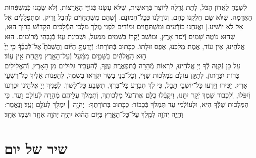 \documentclass[twoside, openany, parskip=half, 11pt]{book}
\begin{document}
\uvaletzion

\\
\\


\label{end of shacharis}
\fullkaddish

\newcommand{\aleinu}{
\firstword{עָלֵֽינוּ}
לְֿשַׁבֵּחַ לַאֲדוֹן הַכֹּל, לָתֵת גְּֿדֻלָּה לְֿיוֹצֵר בְּֿרֵאשִׁית, שֶׁלֹּא עָשָׂנוּ כְּֿגוֹיֵי הָאֲרָצוֹת, וְֿלֹא שָׂמָנוּ כְּֿמִשְׁפְּֿֿֿחוֹת הָאֲדָמָה. שֶׁלֹּא שָׂם חֶלְקֵנוּ כָּהֶם, וְגוֹרָלֵנוּ כְּֿכׇל־הֲמוֹנָם. [שֶׁהֵם מִשְׁתַּחֲוִים לְֿהֶבֶל וָרִיק, וּמִתְפַּלֲּלִים אֶל אֵל לֹא יוֹשִׁיעַ.] וַאֲנַחְנוּ כּוֹרְֿעִים וּמִשְׁתַּחֲוִים וּמוֹדִים לִפְנֵי מֶלֶךְ מַלְכֵי הַמְּֿֿלָכִים הַקָּדוֹשׁ בָּרוּךְ הוּא, שֶׁהוּא נוֹטֶה שָׁמַיִם וְֿיֹסֵד אָרֶץ, וּמוֹשַׁב יְֿקָרוֹ בַּשָּׁמַיִם מִמַּעַל, וּשְׁכִינַת עֻזּוֹ בְּֿגׇבְהֵי מְֿרוֹמִים. הוּא אֱלֹהֵינוּ, אֵין עוֹד, אֱמֶת מַלְכֵּנוּ, אֶפֶס זוּלָתוֹ. כַּכָּתוּב בְּֿתּוֹרָתוֹ: וְֿיָדַעְתָּ֣
\source{דברים ד}
הַיּ֗וֹם וַהֲשֵׁבֹתָ֮ אֶל־לְֿבָבֶ֒ךָ֒ כִּ֤י יְיָ֙ ה֣וּא הָֽאֱלֹהִ֔ים בַּשָּׁמַ֣יִם מִמַּ֔עַל וְֿעַל־הָאָ֖רֶץ מִתָּ֑חַת אֵ֖ין עֽוֹד׃\\
עַל כֵּן נְֿקַוֶּה לְֿךָ יְיָ אֱלֹהֵינוּ, לִרְאוֹת מְֿהֵרָה בְּֿתִפְאֶרֶת עֻזֶּךָ, לְֿהַעֲבִיר גִּלּוּלִים מִן הָאָרֶץ, וְֿהָאֱלִילִים כָּרוֹת יִכָּרֵתוּן, לְֿתַקֵּן עוֹלָם בְּֿמַלְכוּת שַׁדַּי, וְֿכׇל־בְּֿנֵי בָשָׂר יִקְרְֿאוּ בִשְׁמֶךָ, לְֿהַפְנוֹת אֵלֶיךָ כָּל־רִשְׁעֵי אָרֶץ. יַכִּירוּ וְֿיֵדְֿעוּ כָּל־יוֹשְֿֿׁבֵי תֵבֵל, כִּי לְֿךָ תִכְרַע כָּל־בֶּרֶךְ, תִּשָּׁבַע כָּל־לָשׁוֹן. לְֿפָנֶיךָ יְיָ אֱלֹהֵינוּ יִכְרְֿעוּ וְֿיִפֹּלוּ, וְֿלִכְבוֹד שִׁמְךָ יְֿקָר יִתֵּנוּ, וִיקַבְּֿֿלוּ כֻלָּם אֶת־עֹל מַלְכוּתֶךָ, וְֿתִמְלֹךְ עֲלֵיהֶם מְֿהֵרָה לְֿעוֹלָם וָעֶד. כִּי הַמַּלְכוּת שֶׁלְּֿֿךָ הִיא, וּלְעוֹלְֿמֵי עַד תִּמְלֹךְ בְּֿכָבוֹד: כַּכָּתוּב בְּתוֹרָתֶךָ:\source{שמות טו}  יְהֹוָ֥ה ׀ יִמְלֹ֖ךְ לְעֹלָ֥ם וָעֶֽד׃  וְנֶאֱמַר:\source{זכריה יד} וְהָיָ֧ה יְהֹוָ֛ה לְמֶ֖לֶךְ עַל־כׇּל־הָאָ֑רֶץ בַּיּ֣וֹם הַה֗וּא יִהְיֶ֧ה יְהֹוָ֛ה אֶחָ֖ד וּשְׁמ֥וֹ אֶחָֽד׃ 
}

\aleinu


\section[שיר של יום]{ שיר של יום }
\label{shir_shel_yom}
\newcommand{\shirshelyomintro}[1]{\begin{small}הַיּוֹם יוֹם #1 שֶׁבּוֹ הַלְוִיִּם הָיוּ אוֹמְֿרִים בְּבֵית־הַמִּקְדָּשׁ \end{small}}
\end{document}
